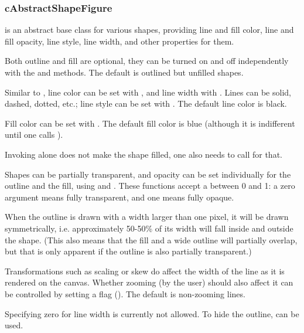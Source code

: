 \subsubsection{cAbstractShapeFigure}
\label{sec:graphics:abstractshapefigure}

 is an abstract base class for various shapes,
providing line and fill color, line and fill opacity, line style, line
width, and other properties for them.

Both outline and fill are optional, they can be turned on and off
independently with the  and 
methods. The default is outlined but unfilled shapes.

Similar to , line color can be set with
, and line width with .
Lines can be solid, dashed, dotted, etc.; line style can be set with
. The default line color is black.

Fill color can be set with . The default fill color
is blue (although it is indifferent until one calls ).

\begin{note}
Invoking  alone does not make the shape filled,
one also needs to call  for that.
\end{note}

Shapes can be partially transparent, and opacity can be set individually
for the outline and the fill, using  and
. These functions accept a  between 0
and 1: a zero argument means fully transparent, and one means fully opaque.

When the outline is drawn with a width larger than one pixel, it will be
drawn symmetrically, i.e. approximately 50-50\% of its width will fall
inside and outside the shape. (This also means that the fill and a wide
outline will partially overlap, but that is only apparent if the
outline is also partially transparent.)

Transformations such as scaling or skew do affect the width of the line as it
is rendered on the canvas. Whether zooming (by the user) should also affect
it can be controlled by setting a flag ().
The default is non-zooming lines.

Specifying zero for line width is currently not allowed. To hide the outline,
 can be used.


